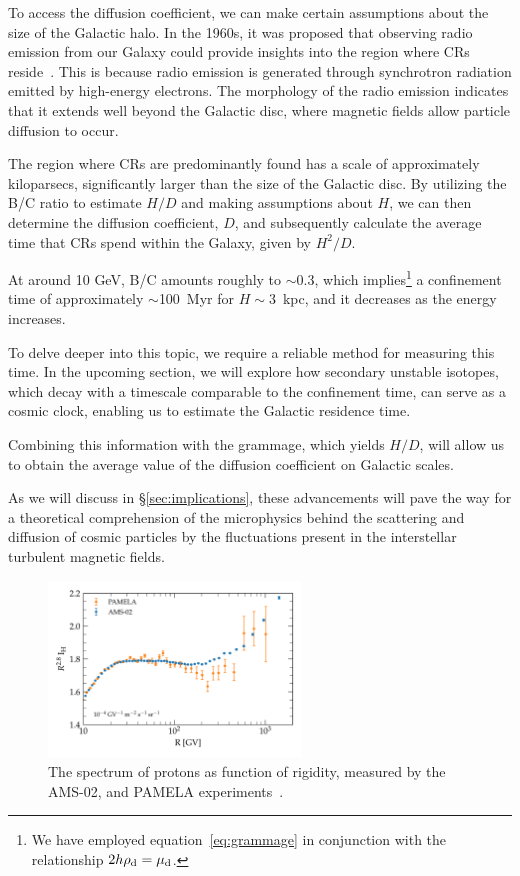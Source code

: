 To access the diffusion coefficient, we can make certain assumptions about the size of the Galactic halo. 
%
In the 1960s, it was proposed that observing radio emission from our Galaxy could provide insights into the region where CRs reside~\cite{Ginzburg1961ptps}. This is because radio emission is generated through synchrotron radiation emitted by high-energy electrons. The morphology of the radio emission indicates that it extends well beyond the Galactic disc, where magnetic fields allow particle diffusion to occur.

The region where CRs are predominantly found has a scale of approximately kiloparsecs, significantly larger than the size of the Galactic disc. By utilizing the B/C ratio to estimate $H/D$ and making assumptions about $H$, we can then determine the diffusion coefficient, $D$, and subsequently calculate the average time that CRs spend within the Galaxy, given by $H^2/D$. 

At around 10 GeV, B/C amounts roughly to $\sim 0.3$, which implies\footnote{We have employed equation~\eqref{eq:grammage} in conjunction with the relationship $2h \rho_{\rm d} = \mu_{\rm d}$.} a confinement time of approximately $\sim$100~Myr for $H \sim 3$~kpc, and it decreases as the energy increases.

To delve deeper into this topic, we require a reliable method for measuring this time. In the upcoming section, we will explore how secondary unstable isotopes, which decay with a timescale comparable to the confinement time, can serve as a cosmic clock, enabling us to estimate the Galactic residence time.

Combining this information with the grammage, which yields $H/D$, will allow us to obtain the average value of the diffusion coefficient on Galactic scales.

As we will discuss in 
\S\ref{sec:implications}, these advancements will pave the way for a theoretical comprehension of the microphysics behind the scattering and diffusion of cosmic particles by the fluctuations present in the interstellar turbulent magnetic fields.

\begin{figure}
\centering
\includegraphics[width=0.6\textwidth]{figures/protons_he.pdf}
\caption{The spectrum of protons as function of rigidity, measured by the AMS-02, and PAMELA experiments~\cite{AMS02results,PAMELA.2011.proton}.}
\label{fig:protonshe}
\end{figure}

